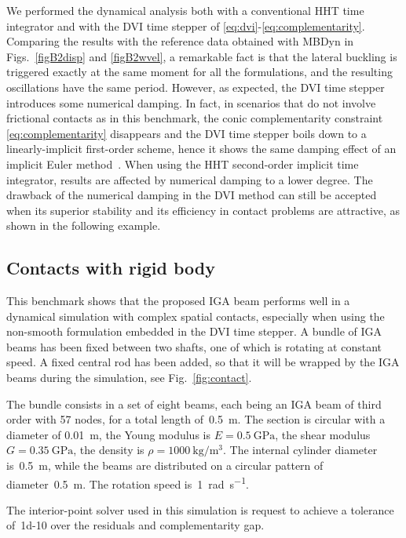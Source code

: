 \documentclass[review]{elsarticle}
\begin{document}
We performed the dynamical analysis both with a conventional HHT time integrator and with the DVI time stepper of \eqref{eq:dvi}-\eqref{eq:complementarity}.
Comparing the results with the reference data obtained with MBDyn in Figs.~\ref{figB2disp} and \ref{figB2wvel}, a remarkable fact is that the lateral buckling is triggered exactly at the same moment for all the formulations, and the resulting oscillations have the same period. 
However, as expected, the DVI time stepper introduces some numerical damping. In fact, in scenarios that do not involve frictional contacts as in this benchmark, the conic complementarity constraint \eqref{eq:complementarity} disappears and the DVI time stepper boils down to a linearly-implicit first-order scheme, hence it shows the same damping effect of an implicit Euler method~\cite{TasoraAnitescuCMAME10}. When using the HHT second-order implicit time integrator, results are affected by numerical damping to a lower degree. The drawback of the numerical damping in the DVI method can still be accepted when its superior stability and its efficiency in contact problems are attractive, as shown in the following example.


\subsection{Contacts with rigid body}

This benchmark shows that the proposed IGA beam performs well in a dynamical simulation with complex spatial contacts, especially when using the non-smooth formulation embedded in the DVI time stepper. 
A bundle of IGA beams has been fixed between two shafts, one of which is rotating at constant speed. A fixed central rod has been added, so that it will be wrapped by the IGA beams during the simulation, see Fig.~\ref{fig:contact}.

The bundle consists in a set of eight beams, each being an IGA beam of third order with \num{57} nodes, for a total length of~\SI{0.5}{\meter}. The section is circular with a diameter of \SI{0.01}{\meter}, the Young modulus is $E=\SI{0.5}{\giga\pascal}$, the shear modulus $G=\SI{0.35}{\giga\pascal}$, the density is $\rho=\SI{1000}{\kilogram\per\cubic\meter}$. The internal cylinder diameter is~\SI{0.5}{\meter}, while the beams are distributed on a circular pattern of diameter~\SI{0.5}{\meter}. The rotation speed is~\SI{1}{\radian\per\second}.

The interior-point solver used in this simulation is request to achieve a tolerance of~\num{1d-10} over the residuals and complementarity gap.
\end{document}
